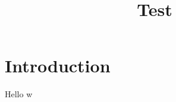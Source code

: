 \documentclass[11pt,a4paper]{article}
\title{Test}
\begin{document}
\maketitle

\chapter{Introduction}

Hello \gls{w}

\cite{balasubramanian:2010:mobile-phones-promote-lifelong-learning}

\printnoidxglossary[type=acronym]

\printbibliography[title={References}]
\end{document}

